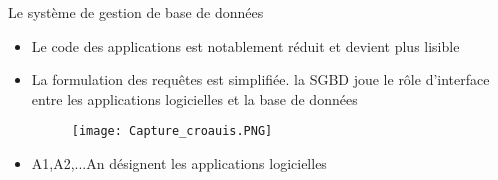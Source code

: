 \documentclass{beamer}
\begin{document}
        \begin{frame}{Le syst\`eme de gestion de base de donn\'ees}
            
    
            
    \begin{itemize}
    
        \item Le code des applications est notablement r\'eduit et devient plus lisible
        \item La formulation des requ\^etes est simplifi\'ee.
        \newline la SGBD joue le r\^ole d'interface entre les applications logicielles et  la base de donn\'ees
        
\begin{figure}[h]
\centering	
 \texttt{[image: Capture\_croauis.PNG]}
\end{figure}
\item A1,A2,...An d\'esignent les applications logicielles
\end{itemize}
\end{frame}
\end{document}
